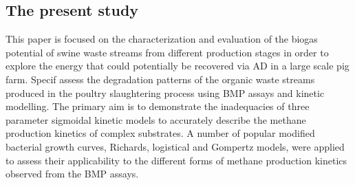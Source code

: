 \subsection{The present study}
This paper is focused on the characterization and evaluation of the biogas potential of swine waste streams from different production stages in order to explore the energy that could potentially be recovered via AD in a large scale pig farm. Specif assess the degradation patterns of the organic waste streams produced in the poultry slaughtering process using BMP assays and kinetic modelling. The primary aim is to demonstrate the inadequacies of three parameter sigmoidal kinetic models to accurately describe the methane production kinetics of complex substrates. A number of popular modified bacterial growth curves, Richards, logistical and Gompertz models, were applied to assess their applicability to the different forms of methane production kinetics observed from the BMP assays.